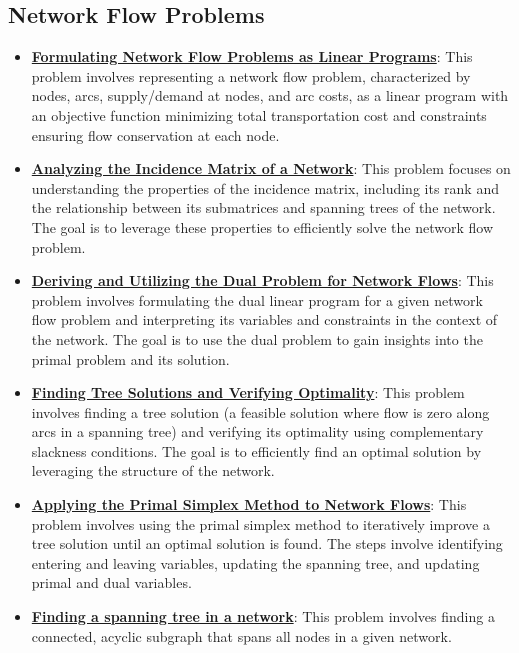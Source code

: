 \documentclass{article}%
\begin{document}
%
\subsection{Network Flow Problems}%
\label{subsec:NetworkFlowProblems}%
\begin{itemize}[leftmargin=*]%
\item \href{https://www.math.purdue.edu/~yipn/421/2024-11-05-NetFlows.pdf#page=2}{\textbf{Formulating Network Flow Problems as Linear Programs}}: This problem involves representing a network flow problem, characterized by nodes, arcs, supply/demand at nodes, and arc costs, as a linear program with an objective function minimizing total transportation cost and constraints ensuring flow conservation at each node.%
\item \href{https://www.math.purdue.edu/~yipn/421/2024-11-05-NetFlows.pdf#page=5}{\textbf{Analyzing the Incidence Matrix of a Network}}: This problem focuses on understanding the properties of the incidence matrix, including its rank and the relationship between its submatrices and spanning trees of the network. The goal is to leverage these properties to efficiently solve the network flow problem.%
\item \href{https://www.math.purdue.edu/~yipn/421/2024-11-05-NetFlows.pdf#page=7}{\textbf{Deriving and Utilizing the Dual Problem for Network Flows}}: This problem involves formulating the dual linear program for a given network flow problem and interpreting its variables and constraints in the context of the network. The goal is to use the dual problem to gain insights into the primal problem and its solution.%
\item \href{https://www.math.purdue.edu/~yipn/421/2024-11-05-NetFlows.pdf#page=10}{\textbf{Finding Tree Solutions and Verifying Optimality}}: This problem involves finding a tree solution (a feasible solution where flow is zero along arcs in a spanning tree) and verifying its optimality using complementary slackness conditions. The goal is to efficiently find an optimal solution by leveraging the structure of the network.%
\item \href{https://www.math.purdue.edu/~yipn/421/2024-11-05-NetFlows.pdf#page=22}{\textbf{Applying the Primal Simplex Method to Network Flows}}: This problem involves using the primal simplex method to iteratively improve a tree solution until an optimal solution is found. The steps involve identifying entering and leaving variables, updating the spanning tree, and updating primal and dual variables.%
\item \href{https://www.math.purdue.edu/~yipn/421/2024-11-07-NetSimplex.pdf#page=1}{\textbf{Finding a spanning tree in a network}}: This problem involves finding a connected, acyclic subgraph that spans all nodes in a given network.%

\end{itemize}
\end{document}

